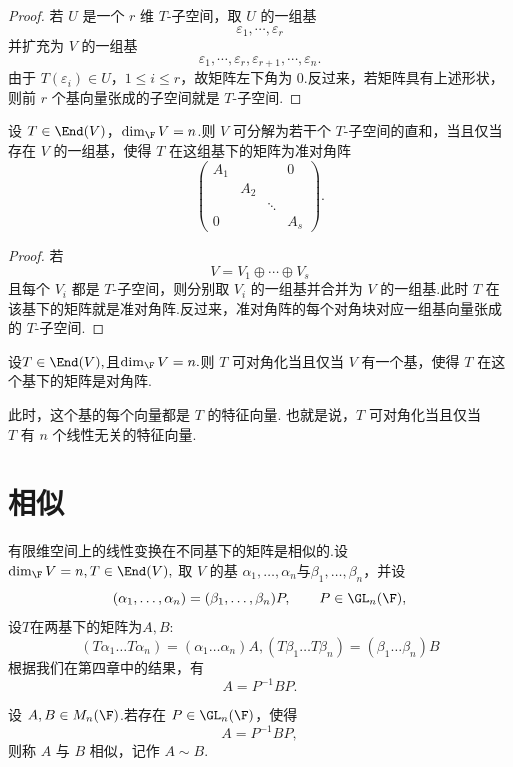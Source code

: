 \begin{proof}
若 $U$ 是一个 $r$ 维 $T$-子空间，取 $U$ 的一组基
\[
\varepsilon_1,\cdots,\varepsilon_r
\]
并扩充为 $V$ 的一组基
\[
\varepsilon_1,\cdots,\varepsilon_r,
\varepsilon_{r+1},\cdots,\varepsilon_n.
\]
由于 $T(\varepsilon_i)\in U$，$1\leq i\leq r$，故矩阵左下角为 $0$.反过来，若矩阵具有上述形状，则前 $r$ 个基向量张成的子空间就是 $T$-子空间.
\end{proof}

\begin{corollary}
设 $T\in\End(V)$，$\dim_{\F}V=n$.则 $V$ 可分解为若干个 $T$-子空间的直和，当且仅当存在 $V$ 的一组基，使得 $T$ 在这组基下的矩阵为准对角阵
\[
\begin{pmatrix}
	A_1&&&0\\
	&A_2&&\\
	&&\ddots&\\
	0&&&A_s
\end{pmatrix}.
\]
\end{corollary}

\begin{proof}
若
\[
V=V_1\oplus\cdots\oplus V_s
\]
且每个 $V_i$ 都是 $T$-子空间，则分别取 $V_i$ 的一组基并合并为 $V$ 的一组基.此时 $T$ 在该基下的矩阵就是准对角阵.反过来，准对角阵的每个对角块对应一组基向量张成的 $T$-子空间.
\end{proof}
\begin{corollary}
	设$T \in \End(V),$且$\dim_{\F} V = n.$则 \(T\) 可对角化当且仅当 \(V\) 有一个基，使得 \(T\) 在这个基下的矩阵是对角阵.
	
	此时，这个基的每个向量都是 \(T\) 的特征向量.
	也就是说，$	T \text{ 可对角化}$当且仅当
	$T \text{ 有 } n \text{ 个线性无关的特征向量}.$
\end{corollary}
\section{相似}

有限维空间上的线性变换在不同基下的矩阵是相似的.设$\dim_{\F}V=n,
 T\in\End(V),$
取 $V$ 的基 $\alpha_1,\ldots,\alpha_n$与$\beta_1,\ldots,\beta_n$，并设
\[
(\alpha_1,\ldots,\alpha_n)=(\beta_1,\ldots,\beta_n)P,
\qquad P\in \GL_n(\F),
\]
设$T$在两基下的矩阵为$A,B$:
\[
(T\alpha_1\ldots T\alpha_n)
=(\alpha_1\ldots\alpha_n)A,
(T\beta_1\ldots T\beta_n)=(\beta_1\ldots\beta_n)B
\]
根据我们在第四章中的结果，有
\[
A=P^{-1}BP.
\]

\begin{definition}\label{p1:concept:c5-l820}
	设 $A,B\in M_n(\F)$.若存在 $P\in \GL_n(\F)$，使得
	\[
	A=P^{-1}BP,
	\]
	则称 $A$ 与 $B$ 相似，记作 $A\sim B$.
\end{definition}

